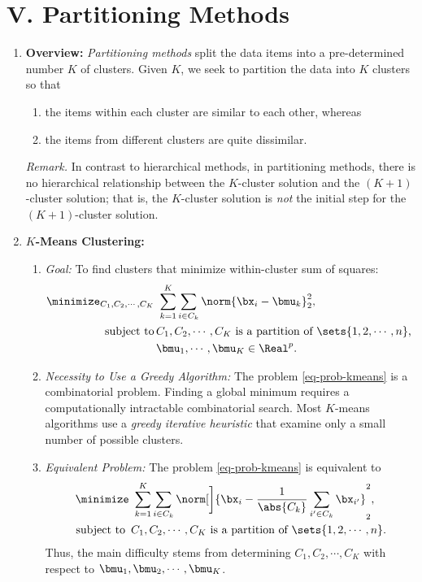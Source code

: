 \documentclass[12pt]{article}
\begin{document}
\section*{V. Partitioning Methods}

\begin{enumerate}[label=\textbf{\arabic*.}]
	
	\item \textbf{Overview:} \emph{Partitioning methods} split the data items into a pre-determined number $K$ of clusters. Given $K$, we seek to partition the data into $K$ clusters so that 
	\begin{enumerate}
		\item the items within each cluster are similar to each other, whereas 
		\item the items from different clusters are quite dissimilar. 
	\end{enumerate}
	
	\textit{Remark.} In contrast to hierarchical methods, in partitioning methods, there is no hierarchical relationship between the $K$-cluster solution and the $(K + 1)$-cluster solution; that is, the $K$-cluster solution is \emph{not} the initial step for the $(K + 1)$-cluster solution. 
	
	\item \textbf{$K$-Means Clustering:} 
	\begin{enumerate}
		\item \textit{Goal:} To find clusters that minimize within-cluster sum of squares: 
		\begin{equation}\label{eq-prob-kmeans}
			\begin{aligned}
				\minimize_{C_1, C_2, \cdots, C_K} & \ \sum_{k=1}^K \sum_{i \in C_k} \norm{\bx_i - \bmu_k}_2^2, \\ 
				\text{ subject to} & \, \text{$C_1, C_2, \cdots, C_K$ is a partition of $\sets{1, 2, \cdots, n}$, } \\ 
				& \, \bmu_1, \cdots, \bmu_K \in \Real^p. 
			\end{aligned}
		\end{equation}
		\item \textit{Necessity to Use a Greedy Algorithm:} The problem \eqref{eq-prob-kmeans} is a combinatorial problem. Finding a global minimum requires a computationally intractable combinatorial search. Most $K$-means algorithms use a \emph{greedy iterative heuristic} that examine only a small number of possible clusters. 
		\item \textit{Equivalent Problem:} The problem \eqref{eq-prob-kmeans} is equivalent to 
		\begin{equation}\label{eq-prob-kmeans-eq}
			\begin{aligned}
				\minimize & \ \sum_{k=1}^K \sum_{i \in C_k} \norm[\bigg]{\bx_i - \frac{1}{\abs{C_k}} \sum_{i' \in C_k} \bx_{i'}}_2^2, \\ 
				\text{subject to } & \, \text{$C_1, C_2, \cdots, C_K$ is a partition of $\sets{1, 2, \cdots, n}$.}
			\end{aligned}
		\end{equation}
		Thus, the main difficulty stems from determining $C_1, C_2, \cdots, C_K$ with respect to $\bmu_1, \bmu_2, \cdots, \bmu_K$. 
		

\end{enumerate}
\end{enumerate}
\end{document}
